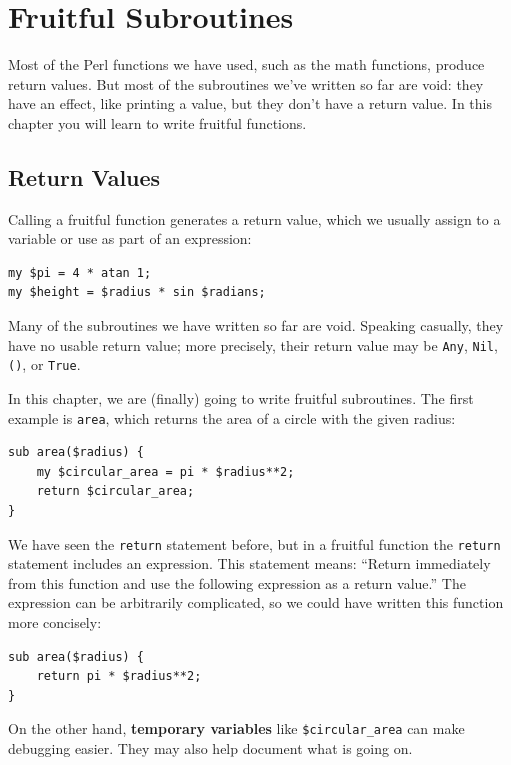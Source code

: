 
\chapter{Fruitful Subroutines}
\label{fruitchap}

Most of the Perl functions we have used, such as the math
functions, produce return values.  But most of the subroutines 
we've written so far are void: they have an effect, like 
printing a value, but they don't have a return value.  In
this chapter you will learn to write fruitful functions.


\section{Return Values}

Calling a fruitful function generates a return value, 
which we usually assign to a variable or use as part 
of an expression:

\begin{verbatim}
my $pi = 4 * atan 1;
my $height = $radius * sin $radians;
\end{verbatim}
%
Many of the subroutines we have written so far are void.  
Speaking casually, they have no usable return value; more 
precisely, their return value may be {\tt Any}, {\tt Nil}, 
{\tt ()}, or {\tt True}.

In this chapter, we are (finally) going to write fruitful subroutines.
The first example is {\tt area}, which returns the area of a circle
with the given radius:

\begin{verbatim}
sub area($radius) {
    my $circular_area = pi * $radius**2;
    return $circular_area;
}
\end{verbatim}
%
We have seen the {\tt return} statement before, but in a fruitful
function the {\tt return} statement includes
an expression.  This statement means: ``Return immediately from
this function and use the following expression as a return value.''
The expression can be arbitrarily complicated, so we could
have written this function more concisely:

\begin{verbatim}
sub area($radius) {
    return pi * $radius**2;
}
\end{verbatim}
%
On the other hand, {\bf temporary variables} like 
\verb'$circular_area' can make debugging easier. They 
may also help document what is going on.


